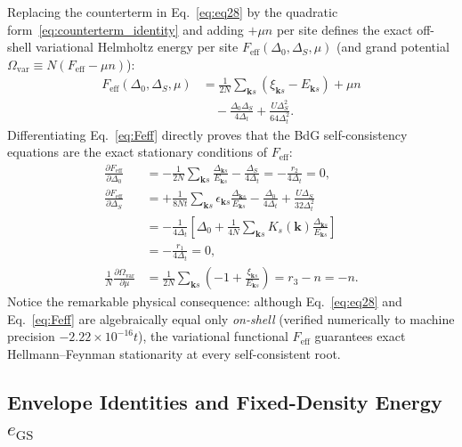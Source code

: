 \documentclass[aps,prb,twocolumn,superscriptaddress,longbibliography,floatfix]{revtex4-2}
\newcommand{\ks}{\mathbf{k}s}
\begin{document}
Replacing the counterterm in Eq.~\eqref{eq:eq28} by the quadratic form~\eqref{eq:counterterm_identity} and adding $+\mu n$ per site defines the exact off-shell variational Helmholtz energy per site $F_{\mathrm{eff}}(\Delta_0,\Delta_S,\mu)$ (and grand potential $\Omega_{\mathrm{var}} \equiv N(F_{\mathrm{eff}}-\mu n)$):
\begin{equation}
\boxed{
\begin{aligned}
F_{\mathrm{eff}}(\Delta_0,\Delta_S,\mu) &= \frac{1}{2N}\sum_{\ks}(\xi_{\ks} - E_{\ks}) + \mu n \\
&\quad - \frac{\Delta_0\Delta_S}{4\Delta_t} + \frac{U\Delta_S^2}{64\Delta_t^2}.
\end{aligned}
}
\label{eq:Feff}
\end{equation}
Differentiating Eq.~\eqref{eq:Feff} directly proves that the BdG self-consistency equations are the exact stationary conditions of $F_{\mathrm{eff}}$:
\begin{align}
\frac{\partial F_{\mathrm{eff}}}{\partial \Delta_0}
&= -\frac{1}{2N}\sum_{\ks}\frac{\Delta_{\ks}}{E_{\ks}} - \frac{\Delta_S}{4\Delta_t}
= -\frac{r_2}{4\Delta_t} = 0, \label{eq:dFeff_dD0}\\
\frac{\partial F_{\mathrm{eff}}}{\partial \Delta_S}
&= +\frac{1}{8Nt}\sum_{\ks}\epsilon_{\ks}\frac{\Delta_{\ks}}{E_{\ks}} - \frac{\Delta_0}{4\Delta_t} + \frac{U\Delta_S}{32\Delta_t^2} \nonumber\\
&= -\frac{1}{4\Delta_t}\!\left[\Delta_0 + \frac{1}{4N}\sum_{\ks}K_s(\mathbf{k})\frac{\Delta_{\ks}}{E_{\ks}}\right] \nonumber\\
&= -\frac{r_1}{4\Delta_t} = 0, \label{eq:dFeff_dDS}\\
\frac{1}{N}\frac{\partial \Omega_{\mathrm{var}}}{\partial \mu}
&= \frac{1}{2N}\sum_{\ks}\left(-1 + \frac{\xi_{\ks}}{E_{\ks}}\right) = r_3 - n = -n. \label{eq:dOmega_dmu_partial}
\end{align}
Notice the remarkable physical consequence: although Eq.~\eqref{eq:eq28} and Eq.~\eqref{eq:Feff} are algebraically equal only \emph{on-shell} (verified numerically to machine precision $-2.22\times 10^{-16}t$), the variational functional $F_{\mathrm{eff}}$ guarantees exact Hellmann--Feynman stationarity at every self-consistent root.

\subsection{Envelope Identities and Fixed-Density Energy \texorpdfstring{$e_{\mathrm{GS}}$}{e\_GS}}
\end{document}
